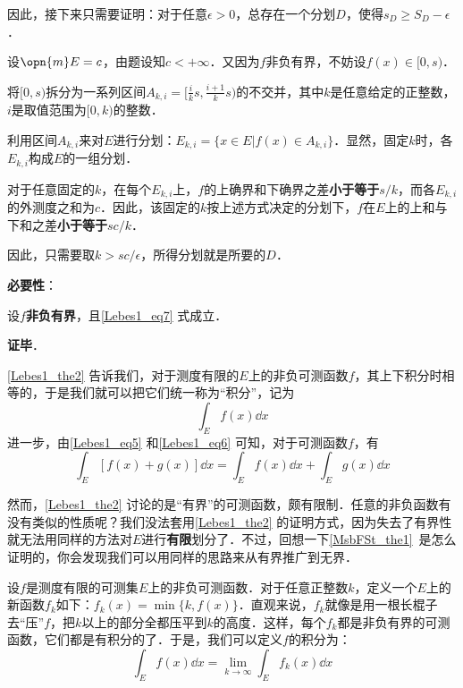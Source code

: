 因此，接下来只需要证明：对于任意$\epsilon>0$，总存在一个分划$D$，使得$s_D\geq S_D-\epsilon$．

设$\opn{m}E=c$，由题设知$c<+\infty$．又因为$f$非负有界，不妨设$f(x)\in [0, s)$．

将$[0, s)$拆分为一系列区间$A_{k, i}=[\frac{i}{k}s, \frac{i+1}{k}s)$的不交并，其中$k$是任意给定的正整数，$i$是取值范围为$[0, k)$的整数．

利用区间$A_{k, i}$来对$E$进行分划：$E_{k, i}=\{x\in E|f(x)\in A_{k, i}\}$．显然，固定$k$时，各$E_{k, i}$构成$E$的一组分划．

对于任意固定的$k$，在每个$E_{k, i}$上，$f$的上确界和下确界之差\textbf{小于等于}$s/k$，而各$E_{k, i}$的外测度之和为$c$．因此，该固定的$k$按上述方式决定的分划下，$f$在$E$上的上和与下和之差\textbf{小于等于}$sc/k$．

因此，只需要取$k>sc/\epsilon$，所得分划就是所要的$D$．

\textbf{必要性}：

设$f$\textbf{非负有界}，且\autoref{Lebes1_eq7} 式成立．




\textbf{证毕}．

\autoref{Lebes1_the2} 告诉我们，对于测度有限的$E$上的非负可测函数$f$，其上下积分时相等的，于是我们就可以把它们统一称为“积分”，记为
\begin{equation}
\int_E f(x) \dd x
\end{equation}
进一步，由\autoref{Lebes1_eq5} 和\autoref{Lebes1_eq6} 可知，对于可测函数$f$，有
\begin{equation}
\int_E [f(x)+g(x)] \dd x=\int_E f(x) \dd x+\int_E g(x) \dd x
\end{equation}

然而，\autoref{Lebes1_the2} 讨论的是“有界”的可测函数，颇有限制．任意的非负函数有没有类似的性质呢？我们没法套用\autoref{Lebes1_the2} 的证明方式，因为失去了有界性就无法用同样的方法对$E$进行\textbf{有限}划分了．不过，回想一下\autoref{MsbFSt_the1}~是怎么证明的，你会发现我们可以用同样的思路来从有界推广到无界．

设$f$是测度有限的可测集$E$上的非负可测函数．对于任意正整数$k$，定义一个$E$上的新函数$f_k$如下：$f_k(x)=\min \{k, f(x)\}$．直观来说，$f_k$就像是用一根长棍子去“压”$f$，把$k$以上的部分全都压平到$k$的高度．这样，每个$f_k$都是非负有界的可测函数，它们都是有积分的了．于是，我们可以定义$f$的积分为：
\begin{equation}
\int_E f(x) \dd x = \lim\limits_{k\to\infty} \int_E f_k(x) \dd x
\end{equation}







